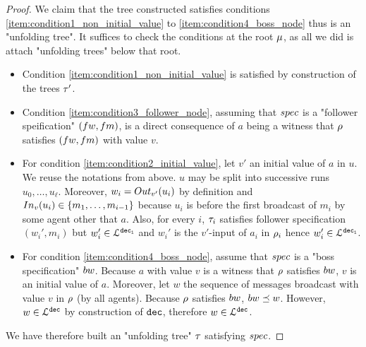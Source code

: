 \begin{proof}
	We claim that the tree constructed satisfies conditions \ref{item:condition1_non_initial_value} to \ref{item:condition4_boss_node} thus is an "unfolding tree". It suffices to check the conditions at the root $\mu$, as all we did is attach "unfolding trees" below that root. 
	\begin{itemize}
	\item Condition \ref{item:condition1_non_initial_value} is satisfied by construction of the trees $\tau'$.
	\item Condition \ref{item:condition3_follower_node}, assuming that $\spec$ is a "follower speification" $(\followwordspec, \followmessagespec)$, is a direct consequence of $a$ being a witness that $\rho$ satisfies $(\followwordspec, \followmessagespec)$ with value $v$. 
	\item For condition \ref{item:condition2_initial_value}, let $v'$ an initial value of $a$ in $u$. We reuse the notations from above. $u$ may be split into successive runs $u_0, \dots, u_\ell$. Moreover, $w_i  = \voutput{v'}{u_i}$ by definition and $\vinput{v}{u_i} \in \set{m_1,\dots,m_{i-1}}$ because $u_i$ is before the first broadcast of $m_i$ by some agent other that $a$. Also, for every $i$, $\tau_i$ satisfies follower specification $(w_i',m_i)$ but $w_i' \in \mathcal{L}^{\mathtt{\mathtt{dec}_i}}$ and $w_i'$ is the $v'$-input of $a_i$ in $\rho_i$ hence $w_i' \in \mathcal{L}^{\mathtt{\mathtt{dec}_i}}$. 
	\item For condition \ref{item:condition4_boss_node}, assume that $\spec$ is a "boss specification" $\bossspec$. Because $a$ with value $v$ is a witness that $\rho$ satisfies $\bossspec$, $v$ is an initial value of $a$. Moreover, let $w$ the sequence of messages broadcast with value $v$ in $\rho$ (by all agents). 
	Because $\rho$ satisfies $\bossspec$, $\bossspec \subword w$. However, $w \in \mathcal{L}^{\mathtt{\mathtt{dec}}}$ by construction of $\mathtt{dec}$, therefore $w \in \mathcal{L}^{\mathtt{\mathtt{dec}}}$.
	\end{itemize}

	We have therefore built an "unfolding tree" $\tau$ satisfying $\spec$. 
\end{proof}
